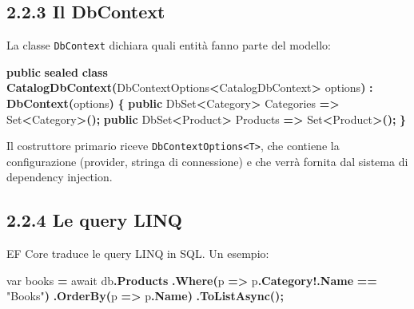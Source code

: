 \documentclass[
  italian,
  10pt,
]{book}
\newenvironment{Shaded}{\begin{snugshade}}{\end{snugshade}}
\newcommand{\DataTypeTok}[1]{\textcolor[rgb]{0.13,0.29,0.53}{#1}}
\newcommand{\FunctionTok}[1]{\textcolor[rgb]{0.13,0.29,0.53}{\textbf{#1}}}
\newcommand{\KeywordTok}[1]{\textcolor[rgb]{0.13,0.29,0.53}{\textbf{#1}}}
\newcommand{\NormalTok}[1]{#1}
\newcommand{\OperatorTok}[1]{\textcolor[rgb]{0.81,0.36,0.00}{\textbf{#1}}}
\newcommand{\StringTok}[1]{\textcolor[rgb]{0.31,0.60,0.02}{#1}}
\begin{document}
\subsection{2.2.3 Il DbContext}\label{il-dbcontext}

La classe \texttt{DbContext} dichiara quali entità fanno parte del
modello:

\begin{Shaded}
\begin{Highlighting}[]
\KeywordTok{public} \KeywordTok{sealed} \KeywordTok{class} \FunctionTok{CatalogDbContext}\OperatorTok{(}\NormalTok{DbContextOptions}\OperatorTok{\textless{}}\NormalTok{CatalogDbContext}\OperatorTok{\textgreater{}}\NormalTok{ options}\OperatorTok{)}
    \OperatorTok{:} \FunctionTok{DbContext}\OperatorTok{(}\NormalTok{options}\OperatorTok{)}
\OperatorTok{\{}
    \KeywordTok{public}\NormalTok{ DbSet}\OperatorTok{\textless{}}\NormalTok{Category}\OperatorTok{\textgreater{}}\NormalTok{ Categories }\OperatorTok{=\textgreater{}}\NormalTok{ Set}\OperatorTok{\textless{}}\NormalTok{Category}\OperatorTok{\textgreater{}();}
    \KeywordTok{public}\NormalTok{ DbSet}\OperatorTok{\textless{}}\NormalTok{Product}\OperatorTok{\textgreater{}}\NormalTok{ Products }\OperatorTok{=\textgreater{}}\NormalTok{ Set}\OperatorTok{\textless{}}\NormalTok{Product}\OperatorTok{\textgreater{}();}
\OperatorTok{\}}
\end{Highlighting}
\end{Shaded}

Il costruttore primario riceve
\texttt{DbContextOptions\textless{}T\textgreater{}}, che contiene la
configurazione (provider, stringa di connessione) e che verrà fornita
dal sistema di dependency injection.

\subsection{2.2.4 Le query LINQ}\label{le-query-linq}

EF Core traduce le query LINQ in SQL. Un esempio:

\begin{Shaded}
\begin{Highlighting}[]
\DataTypeTok{var}\NormalTok{ books }\OperatorTok{=}\NormalTok{ await db}\OperatorTok{.}\FunctionTok{Products}
    \OperatorTok{.}\FunctionTok{Where}\OperatorTok{(}\NormalTok{p }\OperatorTok{=\textgreater{}}\NormalTok{ p}\OperatorTok{.}\FunctionTok{Category}\OperatorTok{!.}\FunctionTok{Name} \OperatorTok{==} \StringTok{"Books"}\OperatorTok{)}
    \OperatorTok{.}\FunctionTok{OrderBy}\OperatorTok{(}\NormalTok{p }\OperatorTok{=\textgreater{}}\NormalTok{ p}\OperatorTok{.}\FunctionTok{Name}\OperatorTok{)}
    \OperatorTok{.}\FunctionTok{ToListAsync}\OperatorTok{();}
\end{Highlighting}
\end{Shaded}
\end{document}
